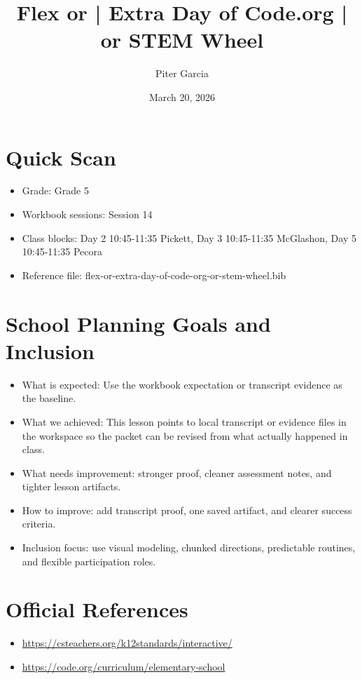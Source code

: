 \documentclass[11pt]{article}
\title{Flex or | Extra Day of Code.org | or STEM Wheel}
\author{Piter Garcia}
\date{March 20, 2026}
\begin{document}
    \maketitle
    \section*{Quick Scan}
    \begin{itemize}[leftmargin=*]
    \item Grade: Grade 5
    \item Workbook sessions: Session 14
    \item Class blocks: Day 2 10:45-11:35 Pickett, Day 3 10:45-11:35 McGlashon, Day 5 10:45-11:35 Pecora
    \item Reference file: flex-or-extra-day-of-code-org-or-stem-wheel.bib
    \end{itemize}
    \section*{School Planning Goals and Inclusion}
    \begin{itemize}[leftmargin=*]
    \item What is expected: Use the workbook expectation or transcript evidence as the baseline.
    \item What we achieved: This lesson points to local transcript or evidence files in the workspace so the packet can be revised from what actually happened in class.
    \item What needs improvement: stronger proof, cleaner assessment notes, and tighter lesson artifacts.
    \item How to improve: add transcript proof, one saved artifact, and clearer success criteria.
    \item Inclusion focus: use visual modeling, chunked directions, predictable routines, and flexible participation roles.
    \end{itemize}
    \section*{Official References}
    \begin{itemize}[leftmargin=*]
    \item \url{https://csteachers.org/k12standards/interactive/}
\item \url{https://code.org/curriculum/elementary-school}

    \end{itemize}
    
\end{document}
